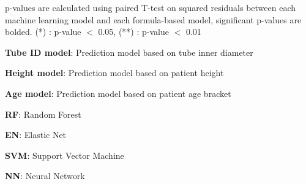 \documentclass[11pt]{article}
\begin{document}
\begin{table}[h]
\caption{\protect\hyperlink{file-table-1-pkl}{Comparison of p-values between machine learning models and formula-based models}}
\label{table:compare_pvalues}
\begin{threeparttable}
\renewcommand{\TPTminimum}{\linewidth}
\begin{tablenotes}
\footnotesize
\item p-values are calculated using paired T-test on squared residuals between each machine learning model and each formula-based model, significant p-values are bolded. (*) : p-value $<$ 0.05, (**) : p-value $<$ 0.01
\item \textbf{Tube ID model}: Prediction model based on tube inner diameter
\item \textbf{Height model}: Prediction model based on patient height
\item \textbf{Age model}: Prediction model based on patient age bracket
\item \textbf{RF}: Random Forest
\item \textbf{EN}: Elastic Net
\item \textbf{SVM}: Support Vector Machine
\item \textbf{NN}: Neural Network
\end{tablenotes}
\end{threeparttable}
\end{table}
\end{document}
